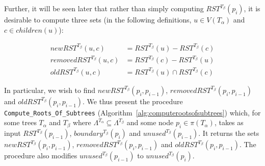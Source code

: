 \documentclass{article}
\newcommand{\leafset}{\Lambda}
\newcommand{\TA}{T_\alpha}
\newcommand{\TB}{T_\beta}
\begin{document}
    Further, it will be seen later that rather than simply computing $RST^{\TB}(p_i)$, it is desirable to compute three sets (in the following definitions, $u \in V(\TA)$ and $c \in children(u)$):

    \begin{align*}
        newRST^{\TB}(u, c) &= RST^{\TB}(u) - RST^{\TB}(c)\\[0.5em]
        removedRST^{\TB}(u, c) &= RST^{\TB}(c) - RST^{\TB}(u)\\[0.5em]
        oldRST^{\TB}(u, c) &= RST^{\TB}(u) \cap RST^{\TB}(c)
    \end{align*}

    In particular, we wish to find $newRST^{\TB}(p_i, p_{i-1})$, $removedRST^{\TB}(p_i, p_{i-1})$ and $oldRST^{\TB}(p_i, p_{i-1})$. We thus present the procedure \texttt{Compute\_Roots\_Of\_Subtrees} (Algorithm~\ref{alg:computerootsofsubtrees}) which, for some trees $\TA$ and $\TB$ where $\leafset^{\TA} \subseteq \leafset^{\TB}$ and some node $p_i \in \pi(\TA)$, takes as input $RST^{\TB}(p_{i-1})$, $boundary^{\TB}(p_i)$ and $unused^{\TB}(p_{i-1})$. It returns the sets $newRST^{\TB}(p_i, p_{i-1})$, $removedRST^{\TB}(p_i, p_{i-1})$ and $oldRST^{\TB}(p_i, p_{i-1})$. The procedure also modifies $unused^{\TB}(p_{i-1})$ to $unused^{\TB}(p_i)$.


\end{document}
